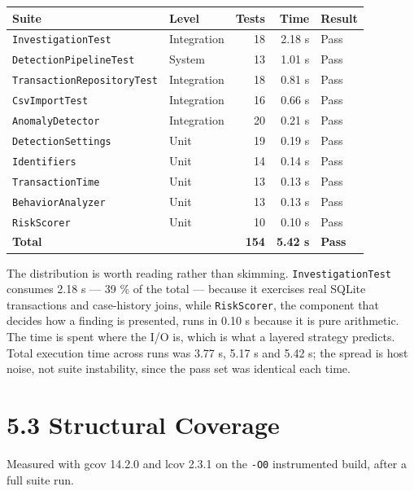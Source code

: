 \documentclass[
  12pt,
]{report}
\begin{document}
\begin{longtable}[]{@{}llrrl@{}}
\toprule\noalign{}
Suite & Level & Tests & Time & Result \\
\midrule\noalign{}
\endhead
\bottomrule\noalign{}
\endlastfoot
\texttt{Investigation\-Test} & Integration & 18 & 2.18 s & Pass \\
\texttt{Detection\-Pipeline\-Test} & System & 13 & 1.01 s & Pass \\
\texttt{Transaction\-Repository\-Test} & Integration & 18 & 0.81 s & Pass \\
\texttt{CsvImportTest} & Integration & 16 & 0.66 s & Pass \\
\texttt{AnomalyDetector} & Integration & 20 & 0.21 s & Pass \\
\texttt{Detection\-Settings} & Unit & 19 & 0.19 s & Pass \\
\texttt{Identifiers} & Unit & 14 & 0.14 s & Pass \\
\texttt{TransactionTime} & Unit & 13 & 0.13 s & Pass \\
\texttt{Behavior\-Analyzer} & Unit & 13 & 0.13 s & Pass \\
\texttt{RiskScorer} & Unit & 10 & 0.10 s & Pass \\
\textbf{Total} & & \textbf{154} & \textbf{5.42 s} & \textbf{Pass} \\
\end{longtable}

The distribution is worth reading rather than skimming.
\texttt{Investigation\-Test} consumes 2.18 s --- 39 \% of the total ---
because it exercises real SQLite transactions and case-history joins,
while \texttt{RiskScorer}, the component that decides how a finding is
presented, runs in 0.10 s because it is pure arithmetic. The time is
spent where the I/O is, which is what a layered strategy predicts. Total
execution time across runs was 3.77 s, 5.17 s and 5.42 s; the spread is
host noise, not suite instability, since the pass set was identical each
time.

\section{5.3 Structural Coverage}\label{structural-coverage}

Measured with gcov 14.2.0 and lcov 2.3.1 on the \texttt{-O0}
instrumented build, after a full suite run.
\end{document}
